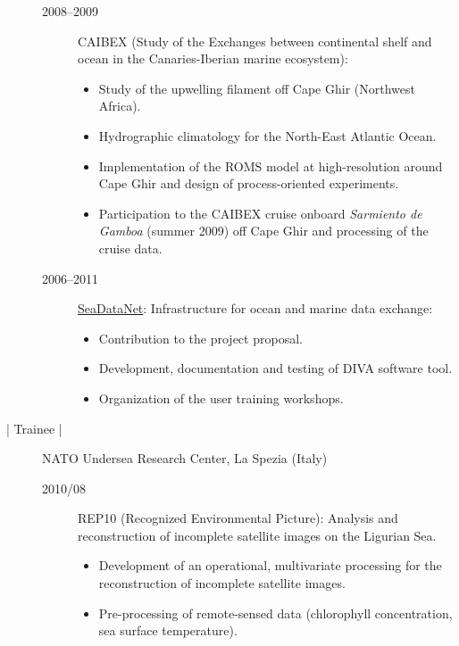 \documentclass[10pt,a4paper,svgnames]{article}
\begin{document}
\begin{description}
\begin{description}
\item[2008--2009] CAIBEX (Study of the Exchanges between continental shelf and ocean in the Canaries-Iberian marine ecosystem):
\begin{itemize}
\item Study of the upwelling filament off Cape Ghir (Northwest Africa).
\item Hydrographic climatology for the North-East Atlantic Ocean.
\item Implementation of the ROMS model at high-resolution around Cape Ghir and design of process-oriented experiments.
\item Participation to the CAIBEX cruise onboard \textit{Sarmiento de Gamboa} (summer 2009) off Cape Ghir and processing of the cruise data.
\end{itemize}

\item[2006--2011] \href{https://www.seadatanet.org}{SeaDataNet}: Infrastructure for ocean and marine data exchange:
\begin{itemize}
\item Contribution to the project proposal.
\item Development, documentation and testing of DIVA software tool.
\item Organization of the user training workshops.
\end{itemize}

\end{description}



\item[\datebox{2010/08--2010/09} | Trainee |] NATO Undersea Research Center, La Spezia (Italy)

\begin{description}
\item[2010/08] REP10 (Recognized Environmental Picture): Analysis and reconstruction of incomplete satellite images on the Ligurian Sea.
\begin{itemize}%
\item Development of an operational, multivariate processing for the reconstruction of incomplete satellite images.
\item Pre-processing of remote-sensed data (chlorophyll concentration, sea surface temperature).
\end{itemize}
\end{description}



\end{description}
\end{document}
